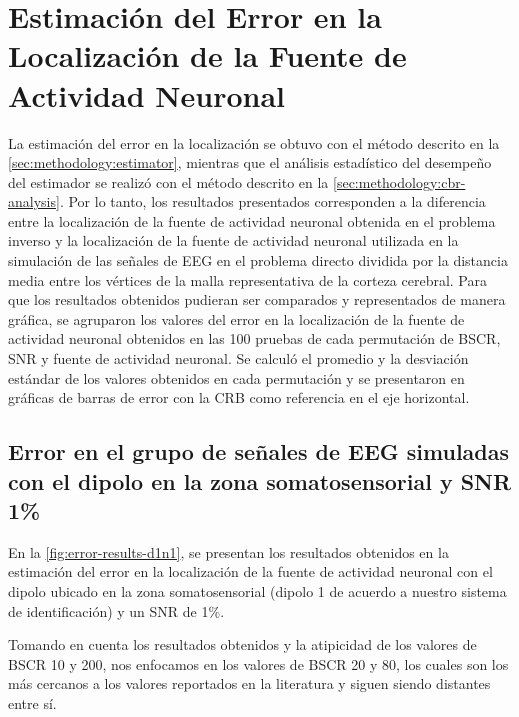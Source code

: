 \section{Estimación del Error en la Localización de la Fuente de Actividad Neuronal}
\label{sec:results:error}

La estimación del error en la localización se obtuvo con el método descrito en la \cref{sec:methodology:estimator}, mientras que el análisis estadístico del desempeño del estimador se realizó con el método descrito en la \cref{sec:methodology:cbr-analysis}.
Por lo tanto, los resultados presentados corresponden a la diferencia entre la localización de la fuente de actividad neuronal obtenida en el problema inverso y la localización de la fuente de actividad neuronal utilizada en la simulación de las señales de EEG en el problema directo dividida por la distancia media entre los vértices de la malla representativa de la corteza cerebral. 
Para que los resultados obtenidos pudieran ser comparados y representados de manera gráfica, se agruparon los valores del error en la localización de la fuente de actividad neuronal obtenidos en las 100 pruebas de cada permutación de BSCR, SNR y fuente de actividad neuronal.
Se calculó el promedio y la desviación estándar de los valores obtenidos en cada permutación y se presentaron en gráficas de barras de error con la CRB como referencia en el eje horizontal.

\subsection{Error en el grupo de señales de EEG simuladas con el dipolo en la zona somatosensorial y SNR 1\%}
\label{sec:results:error:d1n1}

En la \cref{fig:error-results-d1n1}, se presentan los resultados obtenidos en la estimación del error en la localización de la fuente de actividad neuronal con el dipolo ubicado en la zona somatosensorial (dipolo 1 de acuerdo a nuestro sistema de identificación) y un SNR de 1\%.

Tomando en cuenta los resultados obtenidos y la atipicidad de los valores de BSCR 10 y 200, nos enfocamos en los valores de BSCR 20 y 80, los cuales son los más cercanos a los valores reportados en la literatura y siguen siendo distantes entre sí. 

